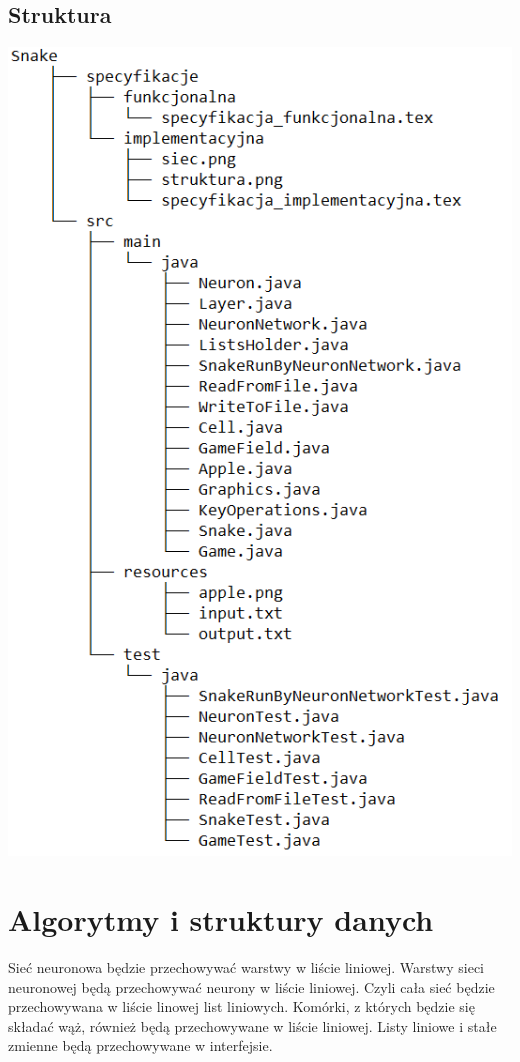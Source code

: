 \documentclass[12pt]{article}
\begin{document}
		\subsection{Struktura}
			\includegraphics[scale=2]{struktura.png}
		
	\section{Algorytmy i struktury danych}
		Sieć neuronowa będzie przechowywać warstwy w liście liniowej. Warstwy sieci neuronowej będą przechowywać neurony w liście liniowej. Czyli cała sieć będzie przechowywana w liście linowej list liniowych. Komórki, z których będzie się składać wąż, również będą przechowywane w liście liniowej. Listy liniowe i stałe zmienne będą przechowywane w interfejsie.  
		
\end{document}

